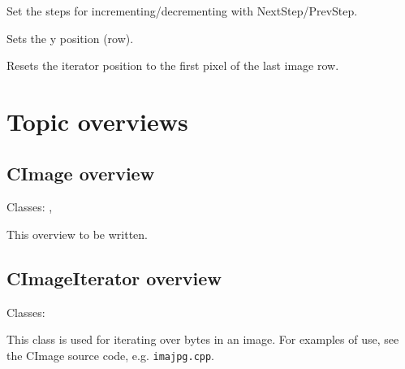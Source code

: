 
Set the steps for incrementing/decrementing with NextStep/PrevStep.



Sets the y position (row).



Resets the iterator position to the first pixel of the last image row.


\chapter{Topic overviews}\label{topics}
%
\setfooter{\thepage}{}{}{}{}{\thepage}%

\section{CImage overview}\label{cimageoverview}

Classes: , 

This overview to be written.

\section{CImageIterator overview}\label{cimageiteratoroverview}

Classes: 

This class is used for iterating over bytes in an image. For examples of use, see
the CImage source code, e.g. {\tt imajpg.cpp}.
